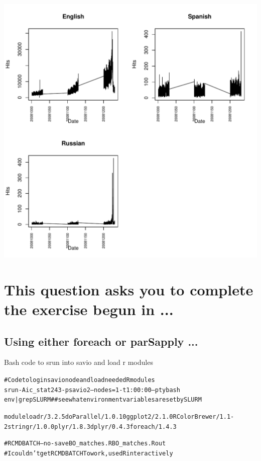 \documentclass{article}\usepackage[]{graphicx}\usepackage[]{color}
\makeatletter
\def\maxwidth{ %
  \ifdim\Gin@nat@width>\linewidth
    \linewidth
  \else
    \Gin@nat@width
  \fi
}
\newenvironment{kframe}{%
 \def\at@end@of@kframe{}%
 \ifinner\ifhmode%
  \def\at@end@of@kframe{\end{minipage}}%
  \begin{minipage}{\columnwidth}%
 \fi\fi%
 \def\FrameCommand##1{\hskip\@totalleftmargin \hskip-\fboxsep
 \colorbox{shadecolor}{##1}\hskip-\fboxsep
     \hskip-\linewidth \hskip-\@totalleftmargin \hskip\columnwidth}%
 \MakeFramed {\advance\hsize-\width
   \@totalleftmargin\z@ \linewidth\hsize
   \@setminipage}}%
 {\par\unskip\endMakeFramed%
 \at@end@of@kframe}
\newenvironment{knitrout}{}{} %
\makeatother
\begin{document}
\begin{knitrout}
\includegraphics[width=\maxwidth]{figure/unnamed-chunk-8-1} 

\end{knitrout}



\section{This question asks you to complete the exercise begun in ...}


\subsection{Using either foreach or parSapply ...}


Bash code to srun into savio and load r modules
\begin{knitrout}
\color{fgcolor}\begin{kframe}
\begin{alltt}
 
# Code to login savio node and load needed R modules
srun -A ic_stat243 -p savio2 --nodes=1 -t 1:00:00 --pty bash
env | grep SLURM  ## see what environment variables are set by SLURM

module load r/3.2.5 doParallel/1.0.10 ggplot2/2.1.0 RColorBrewer/1.1-2 stringr/1.0.0 plyr/1.8.3 dplyr/0.4.3  foreach/1.4.3  
    
#R CMD BATCH --no-save BO_matches.R BO_matches.Rout 
    #I couldn't get R CMD BATCH To work, used R interactively

\end{alltt}
\end{kframe}
\end{knitrout}
\end{document}
